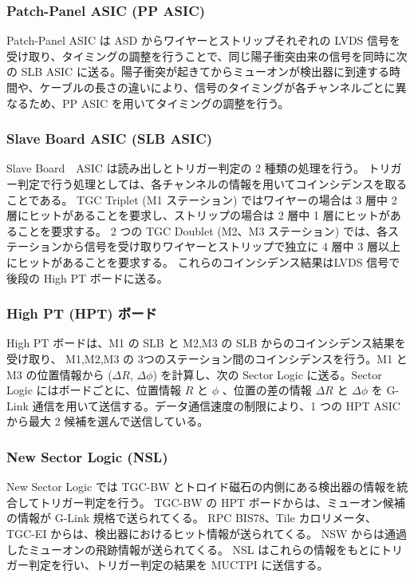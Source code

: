 \subsubsection{Patch-Panel ASIC (PP ASIC)}
Patch-Panel ASIC は ASD からワイヤーとストリップそれぞれの LVDS 信号を受け取り、タイミングの調整を行うことで、同じ陽子衝突由来の信号を同時に次の SLB ASIC に送る。陽子衝突が起きてからミューオンが検出器に到達する時間や、ケーブルの長さの違いにより、信号のタイミングが各チャンネルごとに異なるため、PP ASIC を用いてタイミングの調整を行う。

\subsubsection{Slave Board ASIC (SLB ASIC)}
Slave Board　ASIC は読み出しとトリガー判定の 2 種類の処理を行う。
トリガー判定で行う処理としては、各チャンネルの情報を用いてコインシデンスを取ることである。
TGC Triplet (M1 ステーション) ではワイヤーの場合は 3 層中 2 層にヒットがあることを要求し、ストリップの場合は 2 層中 1 層にヒットがあることを要求する。
2 つの TGC Doublet (M2、M3 ステーション) では、各ステーションから信号を受け取りワイヤーとストリップで独立に 4 層中 3 層以上にヒットがあることを要求する。 これらのコインシデンス結果はLVDS 信号で後段の High PT ボードに送る。

\subsubsection{High PT (HPT) ボード}
High PT ボードは、M1 の SLB と M2,M3 の SLB からのコインシデンス結果を受け取り、 M1,M2,M3 の 3つのステーション間のコインシデンスを行う。M1 と M3 の位置情報から ($\Delta R$, $\Delta \phi$) を計算し、次の Sector Logic に送る。Sector Logic にはボードごとに、位置情報 $R$ と $\phi$ 、位置の差の情報 $\Delta R$ と $\Delta \phi$ を G-Link 通信を用いて送信する。データ通信速度の制限により、1 つの HPT ASIC から最大 2 候補を選んで送信している。

\subsubsection{New Sector Logic (NSL)}
New Sector Logic では TGC-BW とトロイド磁石の内側にある検出器の情報を統合してトリガー判定を行う。
TGC-BW の HPT ボードからは、ミューオン候補の情報が G-Link 規格で送られてくる。
RPC BIS78、Tile カロリメータ、 TGC-EI からは、検出器におけるヒット情報が送られてくる。
NSW からは通過したミューオンの飛跡情報が送られてくる。
NSL はこれらの情報をもとにトリガー判定を行い、トリガー判定の結果を MUCTPI に送信する。

